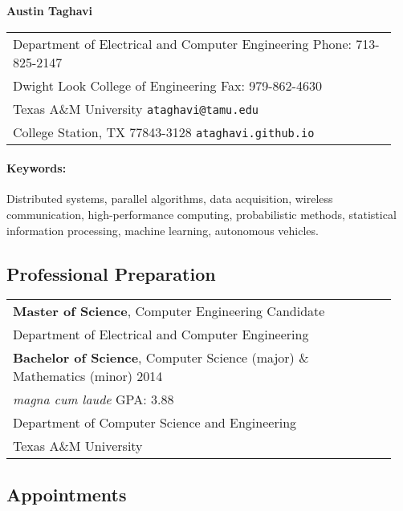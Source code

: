 \newpage

\begin{center}
{\bfseries \Large Austin Taghavi}
\end{center}

\begin{center}
\begin{tabular}{p{0.95\linewidth}}
Department of Electrical and Computer Engineering
\hfill Phone: 713-825-2147 \\
Dwight Look College of Engineering
\hfill Fax: 979-862-4630 \\
Texas A\&M University
\hfill \texttt{ataghavi@tamu.edu} \\
College Station, TX 77843-3128
\hfill \texttt{ataghavi.github.io}
\end{tabular}
\end{center}

\paragraph{Keywords:}
Distributed systems, parallel algorithms, data acquisition, wireless communication, high-performance computing, probabilistic methods, statistical information processing, machine learning, autonomous vehicles.

\subsection*{Professional Preparation}

\begin{center}
\begin{tabular}{p{0.95\linewidth}}
\textbf{Master of Science}, Computer Engineering \hfill Candidate \\
Department of Electrical and Computer Engineering \\[4pt]
\textbf{Bachelor of Science}, Computer Science (major) \& Mathematics (minor) \hfill 2014 \\
\emph{magna cum laude} \hfill GPA: 3.88 \\
Department of Computer Science and Engineering \\
Texas A\&M University
\end{tabular}
\end{center}


\subsection*{Appointments}

